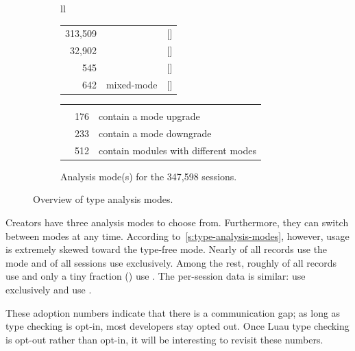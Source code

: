 \documentclass[english,submission,cleveref]{programming}
\begin{document}
\begin{figure}[t]
  \begin{subfigure}[t]{\columnwidth}
    \begin{tabular}[t]{ll} \\
      \begin{tabular}[t]{r@{~~}r@{~}r}
        313,509 & \mnocheck{}   & [\pct{90.19}] \\
         32,902 & \mnonstrict{} & [\pct{ 9.47}] \\
            545 & \mstrict{}    & [\pct{ 0.16}] \\
            642 & mixed-mode    & [\pct{ 0.18}]
      \end{tabular}
      \begin{tabular}[t]{l@{~~}ll}
        \zerowidth{Among the mixed-mode sessions:} \\
        & 176 & contain a mode upgrade \\
        & 233 & contain a mode downgrade \\
        & 512 & contain modules with different modes
      \end{tabular}
    \end{tabular}
    \caption{Analysis mode(s) for the 347,598 sessions.}
    \label{f:total-sessions}
  \end{subfigure}

  \caption{Overview of type analysis modes.}
  \label{f:dataset-overview}
\end{figure}

Creators have three analysis modes to choose from.
Furthermore, they can switch between modes at any time.
According to~\cref{s:type-analysis-modes}, however, usage is
extremely skewed toward the type-free \mnocheck{} mode.
Nearly  of all records use the \mnocheck{} mode
and  of all sessions use \mnocheck{} exclusively.
Among the rest, roughly  of all records use \mnonstrict{} and only a
tiny fraction () use \mstrict{}.
The per-session data is similar:  use \mnonstrict{} exclusively
and  use \mstrict{}.

These adoption numbers indicate that there is a communication gap;
as long as type checking is opt-in, most developers stay opted out.
Once Luau type checking is opt-out rather than opt-in, it will be interesting
to revisit these numbers.
\end{document}
